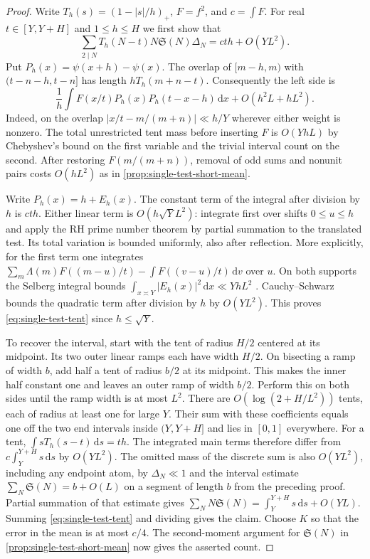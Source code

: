 \documentclass[11pt,a4paper]{article}
\numberwithin{equation}{section}
\newcommand{\SSS}{\mathfrak S}
\newcommand{\ud}{\mathrm d}
\begin{document}
\begin{proof}
Write $T_h(s)=(1-|s|/h)_+$, $F=f^2$, and $c=\int F$.
For real $t\in[Y,Y+H]$ and $1\le h\le H$ we first show that
\begin{equation}
 \sum_{2\mid N}T_h(N-t)N\SSS(N)\Delta_N
       =c t h+O(YL^2).
 \label{eq:single-test-tent}
\end{equation}
Put $P_h(x)=\psi(x+h)-\psi(x)$. The overlap of
$[m-h,m)$ with $(t-n-h,t-n]$ has length $hT_h(m+n-t)$.
Consequently the left side is
\[
 \frac1h\int F(x/t)P_h(x)P_h(t-x-h)\,\ud x
       +O(h^2 L+h L^2).
\]
Indeed, on the overlap $|x/t-m/(m+n)|\ll h/Y$ wherever either
weight is nonzero. The total unrestricted tent mass before
inserting $F$ is $O(YhL)$ by Chebyshev's bound on the first
variable and the trivial interval count on the second.
After restoring $F(m/(m+n))$, removal of odd sums and nonunit
pairs costs $O(hL^2)$ as in \cref{prop:single-test-short-mean}.

Write $P_h(x)=h+E_h(x)$. The constant term of the integral after
division by $h$ is $cth$. Either linear term is $O(h\sqrt Y L^2)$:
integrate first over shifts $0\le u\le h$ and apply the RH prime
number theorem by partial summation to the translated test. Its
total variation is bounded uniformly, also after reflection. More
explicitly, for the first term one integrates
$\sum_m\Lambda(m)F((m-u)/t)-\int F((v-u)/t)\,\ud v$
over $u$. On both supports the Selberg integral bounds
$\int_{x\asymp Y}|E_h(x)|^2\,\ud x\ll YhL^2$
\cite{PracharShort,GoldstonYildirimShort}. Cauchy--Schwarz bounds
the quadratic term after division by $h$ by $O(YL^2)$.
This proves \cref{eq:single-test-tent} since $h\le\sqrt Y$.

To recover the interval, start with the tent of radius $H/2$
centered at its midpoint. Its two outer linear ramps each have
width $H/2$. On bisecting a ramp of width $b$, add half a tent
of radius $b/2$ at its midpoint. This makes the inner half
constant one and leaves an outer ramp of width $b/2$. Perform
this on both sides until the ramp width is at most $L^2$.
There are $O(\log(2+H/L^2))$ tents, each of radius at least
one for large $Y$. Their sum with these coefficients equals one
off the two end intervals inside $(Y,Y+H]$ and lies in $[0,1]$
everywhere. For a tent, $\int sT_h(s-t)\,\ud s=th$. The
integrated main terms therefore differ from
$c\int_Y^{Y+H}s\,\ud s$ by $O(YL^2)$.
The omitted mass of the discrete sum is also $O(YL^2)$,
including any endpoint atom, by $\Delta_N\ll1$ and the
interval estimate $\sum_N\SSS(N)=b+O(L)$ on a segment of
length $b$ from the preceding proof. Partial summation of that
estimate gives $\sum_N N\SSS(N)=\int_Y^{Y+H}s\,\ud s+O(YL)$.
Summing \cref{eq:single-test-tent} and dividing gives the claim.
Choose $K$ so that the error in the mean is at most $c/4$.
The second-moment argument for $\SSS(N)$ in
\cref{prop:single-test-short-mean} now gives the asserted count.
\end{proof}
\end{document}
